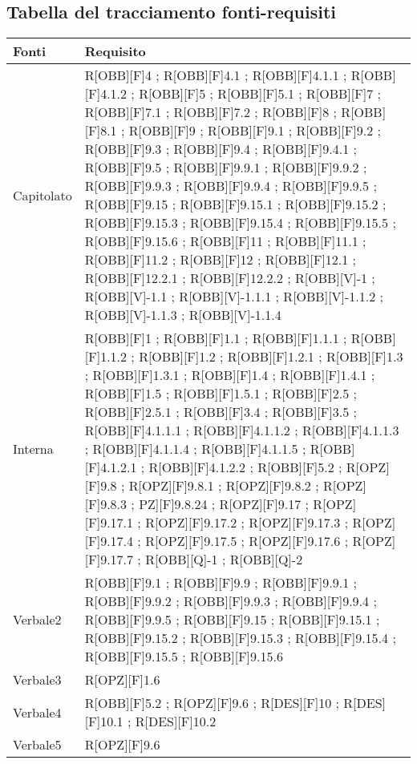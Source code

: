 \subsection{Tabella del tracciamento fonti-requisiti}
	\begin{table}[H]
		\centering
		\begin{tabular}{|p{}|p{}|}
			\toprule
			
			\textbf{Fonti} & \textbf{Requisito} \\
			
			\midrule

			Capitolato & R[OBB][F]4 ; R[OBB][F]4.1 ; R[OBB][F]4.1.1 ; R[OBB][F]4.1.2 ; R[OBB][F]5 ; R[OBB][F]5.1 ; R[OBB][F]7 ; R[OBB][F]7.1 ; R[OBB][F]7.2 ; R[OBB][F]8 ; R[OBB][F]8.1 ; R[OBB][F]9 ; R[OBB][F]9.1 ; R[OBB][F]9.2 ; R[OBB][F]9.3 ; R[OBB][F]9.4 ; R[OBB][F]9.4.1 ; R[OBB][F]9.5 ; R[OBB][F]9.9.1 ; R[OBB][F]9.9.2 ; R[OBB][F]9.9.3 ; R[OBB][F]9.9.4 ; R[OBB][F]9.9.5 ; R[OBB][F]9.15 ; R[OBB][F]9.15.1 ; R[OBB][F]9.15.2 ; R[OBB][F]9.15.3 ; R[OBB][F]9.15.4 ; R[OBB][F]9.15.5 ; R[OBB][F]9.15.6 ; R[OBB][F]11 ; R[OBB][F]11.1 ; R[OBB][F]11.2 ;  R[OBB][F]12 ; R[OBB][F]12.1 ; R[OBB][F]12.2.1 ; R[OBB][F]12.2.2 ; R[OBB][V]-1 ; R[OBB][V]-1.1 ; R[OBB][V]-1.1.1 ; R[OBB][V]-1.1.2 ; R[OBB][V]-1.1.3 ; R[OBB][V]-1.1.4 \\ \midrule

			Interna & R[OBB][F]1 ; R[OBB][F]1.1 ; R[OBB][F]1.1.1 ; R[OBB][F]1.1.2 ; R[OBB][F]1.2 ; R[OBB][F]1.2.1 ; R[OBB][F]1.3 ; R[OBB][F]1.3.1 ;  R[OBB][F]1.4 ; R[OBB][F]1.4.1 ; R[OBB][F]1.5 ; R[OBB][F]1.5.1 ; R[OBB][F]2.5 ; R[OBB][F]2.5.1 ; R[OBB][F]3.4 ; R[OBB][F]3.5 ; R[OBB][F]4.1.1.1 ; R[OBB][F]4.1.1.2 ; R[OBB][F]4.1.1.3 ; R[OBB][F]4.1.1.4 ; R[OBB][F]4.1.1.5 ; R[OBB][F]4.1.2.1 ; R[OBB][F]4.1.2.2 ; R[OBB][F]5.2 ; R[OPZ][F]9.8 ; R[OPZ][F]9.8.1 ; R[OPZ][F]9.8.2 ; R[OPZ][F]9.8.3 ; PZ][F]9.8.24 ; R[OPZ][F]9.17 ; R[OPZ][F]9.17.1 ; R[OPZ][F]9.17.2 ; R[OPZ][F]9.17.3 ; R[OPZ][F]9.17.4 ; R[OPZ][F]9.17.5 ; R[OPZ][F]9.17.6 ; R[OPZ][F]9.17.7 ; R[OBB][Q]-1 ; R[OBB][Q]-2 \\ \midrule
			
			Verbale2 & R[OBB][F]9.1 ; R[OBB][F]9.9 ; R[OBB][F]9.9.1 ; R[OBB][F]9.9.2 ; R[OBB][F]9.9.3 ; R[OBB][F]9.9.4 ; R[OBB][F]9.9.5 ; R[OBB][F]9.15 ; R[OBB][F]9.15.1 ; R[OBB][F]9.15.2 ; R[OBB][F]9.15.3 ; R[OBB][F]9.15.4 ; R[OBB][F]9.15.5 ; R[OBB][F]9.15.6 \\ \midrule
			Verbale3 & R[OPZ][F]1.6 \\ \midrule
			Verbale4 & R[OBB][F]5.2 ; R[OPZ][F]9.6 ; R[DES][F]10 ; R[DES][F]10.1 ; R[DES][F]10.2 \\ \midrule
			Verbale5 & R[OPZ][F]9.6  \\ \midrule

		\end{tabular}
	\end{table}

